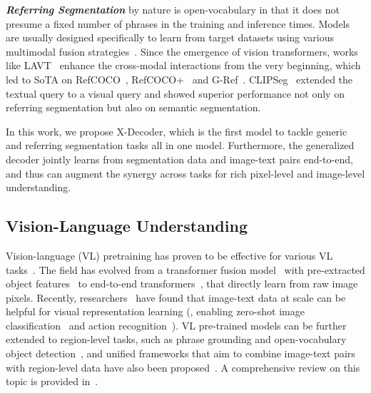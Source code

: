 \documentclass[10pt,twocolumn,letterpaper]{article}
\newcommand{\ourmodel}{X-Decoder}
\begin{document}
\textit{\textbf{Referring Segmentation}} by nature is open-vocabulary in that it does not presume a fixed number of phrases in the training and inference times. Models are usually designed specifically to learn from target datasets using various multimodal fusion strategies~\cite{hu2016segmentation,liu2017recurrent,margffoy2018dynamic,ye2019cross,yu2016modeling}. Since the emergence of vision transformers, works like LAVT~\cite{yang2022lavt} enhance the cross-modal interactions from the very beginning, which led to SoTA on RefCOCO~\cite{yu2016modeling}, RefCOCO+~\cite{yu2016modeling} and G-Ref~\cite{mao2016generation,nagaraja2016modeling}. CLIPSeg~\cite{luddecke2022image} extended the textual query to a visual query and showed superior performance not only on referring segmentation but also on semantic segmentation.

In this work, we propose \ourmodel{}, which is the first model to tackle generic and referring segmentation tasks all in one model. Furthermore, the generalized decoder jointly learns from segmentation data and image-text pairs end-to-end, and thus can augment the synergy across tasks for rich pixel-level and image-level understanding.

\subsection{Vision-Language Understanding}
Vision-language (VL) pretraining has proven to be effective for various VL tasks~\cite{lu2019vilbert,tan-bansal-2019-lxmert,su2019vl,li2019visualbert}. The field has evolved from a transformer fusion model~\cite{chen2020uniter,li2020oscar,zhang2021vinvl} with pre-extracted object features~\cite{anderson2018bottom} to end-to-end transformers~\cite{kim2021vilt,li2021align,dou2021empirical}, that directly learn from raw image pixels.
Recently, researchers~\cite{wang2021simvlm,beit3,singh2022flava} have found that image-text data at scale can be helpful for visual representation learning (\eg, enabling zero-shot image classification~\cite{radford2021learning,jia2021scaling} and action recognition~\cite{yuan2021florence,yu2022coca}). VL pre-trained models can be further extended to region-level tasks, such as phrase grounding and open-vocabulary object detection~\cite{kamath2021mdetr,gu2021open,zhong2022regionclip,minderer2022simple}, and unified frameworks that aim to combine image-text pairs with region-level data have also been proposed~\cite{cai2022x,li2022grounded,zhang2022glipv2,yao2022detclip,fiber2022}. A comprehensive review on this topic is provided in~\cite{gan2022vision}.
\end{document}
